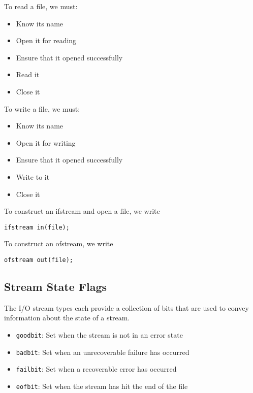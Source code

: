 \documentclass{article}
\begin{document}
 	\begin{center}
 	\end{center}
	
	To read a file, we must:
	\begin{itemize}
		\item Know its name
		\item Open it for reading
		\item Ensure that it opened successfully 
		\item Read it
		\item Close it
	\end{itemize}

	To write a file, we must:
	\begin{itemize}
		\item Know its name
		\item Open it for writing
		\item Ensure that it opened successfully
		\item Write to it
		\item Close it
	\end{itemize}
	
	To construct an ifstream and open a file, we write
	\begin{lstlisting}[gobble=4]
		ifstream in(file);
	\end{lstlisting}
	To construct an ofstream, we write
	\begin{lstlisting}[gobble=4]
		ofstream out(file);
	\end{lstlisting}
	
	\subsection{Stream State Flags}
	
	The I/O stream types each provide a collection of bits that are used to convey information about the state of a stream.
	\begin{itemize}
		\item \verb|goodbit|: Set when the stream is not in an error state
		\item \verb|badbit|: Set when an unrecoverable failure has occurred 
		\item \verb|failbit|: Set when a recoverable error has occurred
		\item \verb|eofbit|: Set when the stream has hit the end of the file
	\end{itemize}
	
\end{document}
